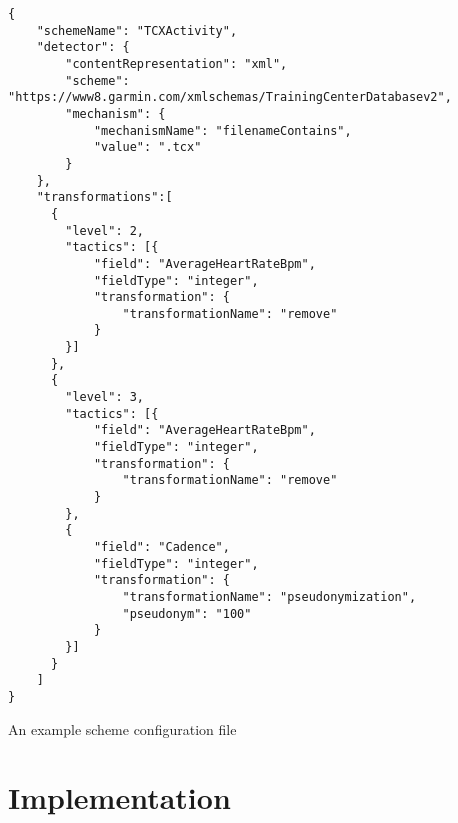 \begin{listing}
\begin{verbatim}
{
	"schemeName": "TCXActivity",
    "detector": {
    	"contentRepresentation": "xml",
        "scheme": "https://www8.garmin.com/xmlschemas/TrainingCenterDatabasev2",
        "mechanism": {
        	"mechanismName": "filenameContains",
            "value": ".tcx"
        }
    },
    "transformations":[
      {
      	"level": 2,
        "tactics": [{
        	"field": "AverageHeartRateBpm",
			"fieldType": "integer",
			"transformation": {
            	"transformationName": "remove"
            }
        }]
      },
      {
      	"level": 3,
        "tactics": [{
        	"field": "AverageHeartRateBpm",
          	"fieldType": "integer",
          	"transformation": {
            	"transformationName": "remove"
            }
        },
        {
        	"field": "Cadence",
          	"fieldType": "integer",
          	"transformation": {
            	"transformationName": "pseudonymization",
              	"pseudonym": "100"
            }
        }]
      }
    ]
}
\end{verbatim}
\caption{An example scheme configuration file}
\end{listing}


\section{Implementation}

